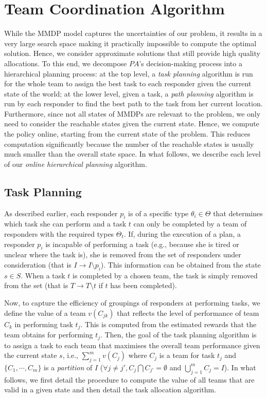 \section{Team Coordination Algorithm}
\label{sec:algo}
While the MMDP model captures the uncertainties of our
problem, it results in a very large search space making it
practically impossible to compute the optimal solution. Hence, we consider approximate solutions that still provide
high quality allocations. To this end, we decompose $PA$'s
decision-making process into a hierarchical planning process: at the top level, a {\em task planning} algorithm is run
for the whole team to assign the best task to each responder given
the current state of the world; at the lower level, given a task, a
{\em path planning} algorithm is run by each responder to find the
best path to the task from her current location. Furthermore,
since not all states of MMDPs are relevant to the problem, we
only need to consider the reachable states given the current state.
Hence, we compute the policy online, starting from the current state
of the problem. This reduces computation significantly
because the number of the reachable states is usually much smaller
than the overall state space. In what follows, we describe each
level of our {\em online hierarchical planning} algorithm.

\subsection{Task Planning} \label{sec:taskplanning} As described earlier, each responder $p_i$ is of a specific type
$\theta_i \in \Theta$ that determines which task she can perform
and  a task $t$ can only be completed by a team of responders with
the required types $\Theta_t$. If, during the execution
of a plan, a responder $p_i$ is incapable of performing a task
(e.g., because she is tired or unclear where the task is), she
is removed from the set of responders under consideration
(that is $I \to I \setminus p_i$). This information can be obtained
from the state $s \in S$. When a task $t$ is completed by a chosen
team, the task is simply removed from the set (that is $T \to
T\setminus t$ if $t$ has been completed).

Now, to capture the efficiency of groupings of responders at
performing tasks, we define the value of a team $v(C_{jk})$ that
reflects the level of performance of team $C_k$ in performing task
$t_j$. This is computed from the estimated rewards that the team
obtains for performing $t_j$.  Then, the goal of the task planning
algorithm is to assign a task to each team that maximises the
overall team performance given the current state $s$, i.e.,
$\sum_{j=1}^m v(C_{j})$ where $C_j$ is a team for task $t_j$ and
$\{ C_1, \cdots, C_m \}$ is a {\em partition} of $I$ ($\forall
j\neq j', C_j \bigcap C_{j'} = \emptyset$ and $\bigcup_{j=1}^m
C_j=I$). In what follows, we first detail the procedure to compute
the value of all teams that are valid in a given state and then
detail the task allocation algorithm.


